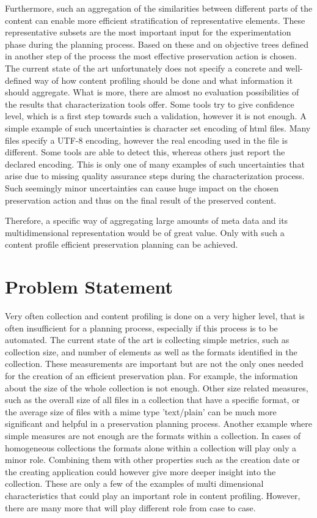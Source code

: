 Furthermore, such an aggregation of the similarities between different parts of the content can enable more efficient stratification of representative elements. These representative subsets 
are the most important input for the experimentation phase during the planning process. Based on these and on objective trees defined in another step of the process the most effective preservation action is chosen.
The current state of the art unfortunately does not specify a concrete and well-defined way of how content profiling should be done and what information it should aggregate. What is more, there are almost no evaluation possibilities of the results that characterization tools offer. Some tools try to give confidence level, which is a first step towards such a validation, however it is not enough. A simple example of such uncertainties is character set encoding of html files. Many files specify a UTF-8 encoding, however the real encoding used in the file is different. Some tools are able to detect this, whereas others just report the declared encoding. This is only one of many examples of such uncertainties that arise due to missing quality assurance steps during the characterization process. Such seemingly minor uncertainties can cause huge impact on the chosen preservation action and thus on the final result of the preserved content.

Therefore, a specific way of aggregating large amounts of meta data and its multidimensional representation would be of great value. Only with such a content profile efficient preservation planning can be achieved.

\section{Problem Statement}
Very often collection and content profiling is done on a very higher level, that
is often insufficient for a planning process, especially if this process is to be automated.
The current state of the art is collecting simple metrics, such as collection size, and number of elements as well as the formats identified in the collection. These measurements are important but are not the only ones needed for the creation of an efficient preservation plan.
For example, the information about the size of the whole collection is not enough. Other size related measures, such as the overall size of all files in a collection that have a specific format, or the average size of files with a mime type 'text/plain' can be much more significant and helpful in a preservation planning process. Another example where simple measures are not enough are the formats within a collection. In cases of homogeneous collections the formats alone within a collection will play only a minor role. Combining them with other properties such as the creation date or the creating application could however give more deeper insight into the collection.
These are only a few of the examples of multi dimensional characteristics that could play an important role in content profiling. However, there are many more that will play different role from case to case.

